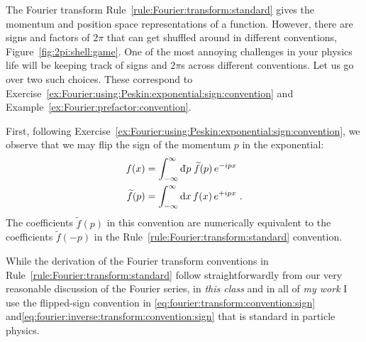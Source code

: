
The Fourier transform Rule~\ref{rule:Fourier:transform:standard} gives the momentum and position space representations of a function. However, there are signs and factors of $2\pi$ that can get shuffled around in different conventions, Figure~\ref{fig:2pi:shell:game}. One of the most annoying challenges in your physics life will be keeping track of signs and $2\pi$s across different conventions. Let us go over two such choices. These correspond to Exercise~\ref{ex:Fourier:using:Peskin:exponential:sign:convention} and Example~\ref{ex:Fourier:prefactor:convention}.

First, following Exercise~\ref{ex:Fourier:using:Peskin:exponential:sign:convention}, we observe that we may flip the sign of the momentum $p$ in the exponential:
\begin{align}
    f(x) &= 
    \int_{-\infty}^\infty \Dbar{p}\; 
    \tilde f(p)\,
    e^{-ipx} 
    \label{eq:fourier:transform:convention:sign}
\\
    \tilde f(p) &= 
    \int_{-\infty}^\infty \D{x}\, f(x)\, e^{+ipx} 
    \ .
    \label{eq:fourier:inverse:transform:convention:sign}
\end{align}
The coefficients $\tilde f(p)$ in this convention are numerically equivalent to the coefficients $\tilde f(-p)$ in the Rule~\ref{rule:Fourier:transform:standard} convention.

\begin{newrule}\label{rule:Fourier:transform:Flip}
While the derivation of the Fourier transform conventions in Rule~\ref{rule:Fourier:transform:standard} follow straightforwardly from our very reasonable discussion of the Fourier series, in \emph{this class} and in all of \emph{my work} I use the flipped-sign convention in \eqref{eq:fourier:transform:convention:sign} and\eqref{eq:fourier:inverse:transform:convention:sign} that is standard in particle physics.\sidenotemark 
\end{newrule}

